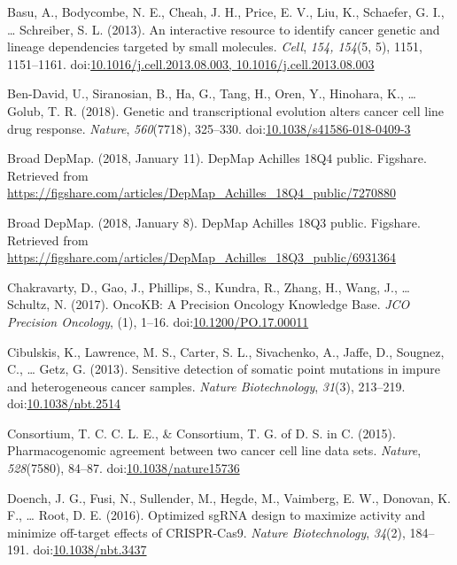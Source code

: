 \documentclass[man,floatsintext]{apa6}
\begin{document}
\hypertarget{ref-basu2013}{}
Basu, A., Bodycombe, N. E., Cheah, J. H., Price, E. V., Liu, K.,
Schaefer, G. I., \ldots{} Schreiber, S. L. (2013). An interactive
resource to identify cancer genetic and lineage dependencies targeted by
small molecules. \emph{Cell}, \emph{154, 154}(5, 5), 1151, 1151--1161.
doi:\href{https://doi.org/10.1016/j.cell.2013.08.003,\%2010.1016/j.cell.2013.08.003}{10.1016/j.cell.2013.08.003, 10.1016/j.cell.2013.08.003}

\hypertarget{ref-ben-david2018}{}
Ben-David, U., Siranosian, B., Ha, G., Tang, H., Oren, Y., Hinohara, K.,
\ldots{} Golub, T. R. (2018). Genetic and transcriptional evolution
alters cancer cell line drug response. \emph{Nature}, \emph{560}(7718),
325--330.
doi:\href{https://doi.org/10.1038/s41586-018-0409-3}{10.1038/s41586-018-0409-3}

\hypertarget{ref-broaddepmap2018a}{}
Broad DepMap. (2018, January 11). DepMap Achilles 18Q4 public. Figshare.
Retrieved from
\url{https://figshare.com/articles/DepMap_Achilles_18Q4_public/7270880}

\hypertarget{ref-broaddepmap2018}{}
Broad DepMap. (2018, January 8). DepMap Achilles 18Q3 public. Figshare.
Retrieved from
\url{https://figshare.com/articles/DepMap_Achilles_18Q3_public/6931364}

\hypertarget{ref-chakravarty2017}{}
Chakravarty, D., Gao, J., Phillips, S., Kundra, R., Zhang, H., Wang, J.,
\ldots{} Schultz, N. (2017). OncoKB: A Precision Oncology Knowledge
Base. \emph{JCO Precision Oncology}, (1), 1--16.
doi:\href{https://doi.org/10.1200/PO.17.00011}{10.1200/PO.17.00011}

\hypertarget{ref-cibulskis2013}{}
Cibulskis, K., Lawrence, M. S., Carter, S. L., Sivachenko, A., Jaffe,
D., Sougnez, C., \ldots{} Getz, G. (2013). Sensitive detection of
somatic point mutations in impure and heterogeneous cancer samples.
\emph{Nature Biotechnology}, \emph{31}(3), 213--219.
doi:\href{https://doi.org/10.1038/nbt.2514}{10.1038/nbt.2514}

\hypertarget{ref-consortium2015}{}
Consortium, T. C. C. L. E., \& Consortium, T. G. of D. S. in C. (2015).
Pharmacogenomic agreement between two cancer cell line data sets.
\emph{Nature}, \emph{528}(7580), 84--87.
doi:\href{https://doi.org/10.1038/nature15736}{10.1038/nature15736}

\hypertarget{ref-doench2016a}{}
Doench, J. G., Fusi, N., Sullender, M., Hegde, M., Vaimberg, E. W.,
Donovan, K. F., \ldots{} Root, D. E. (2016). Optimized sgRNA design to
maximize activity and minimize off-target effects of CRISPR-Cas9.
\emph{Nature Biotechnology}, \emph{34}(2), 184--191.
doi:\href{https://doi.org/10.1038/nbt.3437}{10.1038/nbt.3437}
\end{document}
